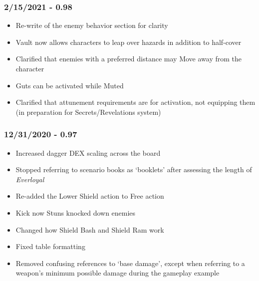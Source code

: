 \documentclass[12pt]{article}
\begin{document}
\begin{multicols*}{2}
\subsubsection*{2/15/2021 - 0.98}
\begin{itemize}
\item Re-write of the enemy behavior section for clarity
\item Vault now allows characters to leap over hazards in addition to half-cover
\item Clarified that enemies with a preferred distance may Move away from the character
\item Guts can be activated while Muted
\item Clarified that attunement requirements are for activation, not equipping them (in preparation for Secrets/Revelations system)
\end{itemize}
\subsubsection*{12/31/2020 - 0.97}
\begin{itemize}
\item Increased dagger DEX scaling across the board
\item Stopped referring to scenario books as ‘booklets’ after assessing the length of \emph{Everloyal}
\item Re-added the Lower Shield action to Free action
\item Kick now Stuns knocked down enemies
\item Changed how Shield Bash and Shield Ram work
\item Fixed table formatting
\item Removed confusing references to ‘base damage’, except when referring to a weapon’s minimum possible damage during the gameplay example
\end{itemize}

\end{multicols*}
\end{document}
